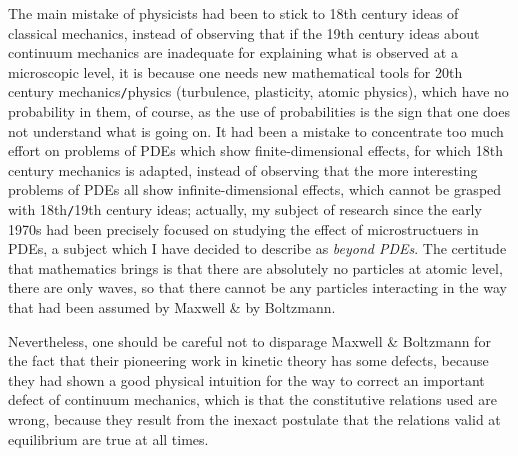 \documentclass{article}
\begin{document}
\begin{enumerate}
	The main mistake of physicists had been to stick to 18th century ideas of classical mechanics, instead of observing that if the 19th century ideas about continuum mechanics are inadequate for explaining what is observed at a microscopic level, it is because one needs new mathematical tools for 20th century mechanics{\tt/}physics (turbulence, plasticity, atomic physics), which have no probability in them, of course, as the use of probabilities is the sign that one does not understand what is going on. It had been a mistake to concentrate too much effort on problems of PDEs which show finite-dimensional effects, for which 18th century mechanics is adapted, instead of observing that the more interesting problems of PDEs all show infinite-dimensional effects, which cannot be grasped with 18th{\tt/}19th century ideas; actually, my subject of research since the early 1970s had been precisely focused on studying the effect of microstructuers in PDEs, a subject which I have decided to describe as {\it beyond PDEs}. The certitude that mathematics brings is that there are absolutely no particles at atomic level, there are only waves, so that there cannot be any particles interacting in the way that had been assumed by {\sc Maxwell} \& by {\sc Boltzmann}.
	
	Nevertheless, one should be careful not to disparage {\sc Maxwell \& Boltzmann} for the fact that their pioneering work in kinetic theory has some defects, because they had shown a good physical intuition for the way to correct an important defect of continuum mechanics, which is that the constitutive relations used are wrong, because they result from the inexact postulate that the relations valid at equilibrium are true at all times.
	

\end{enumerate}
\end{document}
